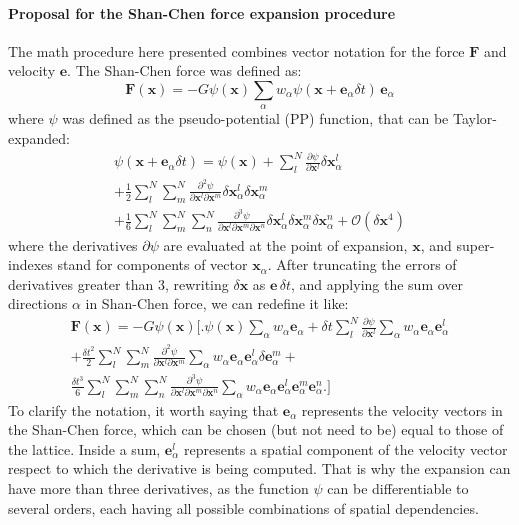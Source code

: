 \documentclass{article}
\begin{document}
	\paragraph{Proposal for the Shan-Chen force expansion procedure} The math procedure here presented combines vector notation for the force $\mathbf{F}$ and velocity $\mathbf{e}$. The Shan-Chen force was defined as:
	\begin{equation}
		\mathbf{F}(\mathbf{x}) = -G \psi(\mathbf{x}) \sum_{\alpha} w_\alpha \psi(\mathbf{x}+\mathbf{e}_\alpha \delta t) \, \mathbf{e}_\alpha
	\end{equation}
	where $\psi$ was defined as the pseudo-potential (PP) function, that can be Taylor-expanded:
	\begin{multline}
		\psi(\mathbf{x}+\mathbf{e}_\alpha \delta t)  = \psi(\mathbf{x}) + \sum_{l}^{N} \frac{\partial \psi}{\partial \mathbf{x}^l} \delta \mathbf{x}_\alpha^l \\+ \frac{1}{2} \sum_{l}^{N} \sum_{m}^{N} \frac{\partial^2 \psi}{\partial \mathbf{x}^l \partial \mathbf{x}^m} \delta \mathbf{x}_\alpha^l \delta \mathbf{x}_\alpha^m \\+ \frac{1}{6} \sum_{l}^{N} \sum_{m}^{N} \sum_{n}^{N} \frac{\partial^3 \psi}{\partial \mathbf{x}^l \partial \mathbf{x}^m \partial \mathbf{x}^n} \delta \mathbf{x}_\alpha^l \delta \mathbf{x}_\alpha^m \delta \mathbf{x}_\alpha^n + \mathcal{O}(\delta \mathbf{x}^4)
	\end{multline}
	where the derivatives $\partial \psi$ are evaluated at the point of expansion, $\mathbf{x}$, and super-indexes stand for components of vector $\mathbf{x}_\alpha$. After truncating the errors of derivatives greater than 3, rewriting $\delta \mathbf{x}$ as $\mathbf{e} \, \delta t$, and applying the sum over directions $\alpha$ in Shan-Chen force, we can redefine it like:
	\begin{multline}
		\mathbf{F}(\mathbf{x}) = -G \psi (\mathbf{x}) \big[ \big. \psi(\mathbf{x}) \sum_{\alpha} w_\alpha \mathbf{e}_\alpha + \delta t \sum_{l}^{N} \frac{\partial \psi}{\partial \mathbf{x}^l} \sum_\alpha w_\alpha \mathbf{e}_\alpha \mathbf{e}_\alpha^l \\ + \frac{\delta t^2}{2} \sum_{l}^{N} \sum_{m}^{N} \frac{\partial^2 \psi}{\partial \mathbf{x}^l \partial \mathbf{x}^m} \sum_\alpha w_\alpha \mathbf{e}_\alpha \mathbf{e}_\alpha^l \delta \mathbf{e}_\alpha^m +\\ \frac{\delta t^3}{6} \sum_{l}^{N} \sum_{m}^{N} \sum_{n}^{N} \frac{\partial^3 \psi}{\partial \mathbf{x}^l \partial \mathbf{x}^m \partial \mathbf{x}^n} \sum_\alpha w_\alpha \mathbf{e}_\alpha \mathbf{e}_\alpha^l \mathbf{e}_\alpha^m \mathbf{e}_\alpha^n  \big. \big]
	\end{multline}
	To clarify the notation, it worth saying that $\mathbf{e}_\alpha$ represents the velocity vectors in the Shan-Chen force, which can be chosen (but not need to be) equal to those of the lattice. Inside a sum, $\mathbf{e}_\alpha^l$ represents a spatial component of the velocity vector respect to which the derivative is being computed. That is why the expansion can have more than three derivatives, as the function $\psi$ can be differentiable to several orders, each having all possible combinations of spatial dependencies.
	
\end{document}
